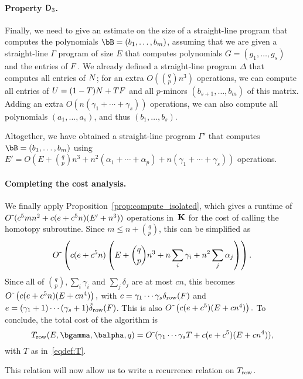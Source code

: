 \documentclass[12pt]{article}
\begin{document}
\paragraph{Property $\mathsf{D}_3$.} Finally, we need to give an estimate on
the size of a straight-line program that computes the polynomials
$\bB=(b_1,\dots,b_m)$, assuming that we are given a straight-line
$\Gamma$ program of size $E$ that computes polynomials
$G=(g_1,\dots,g_s)$ and the entries of ${F}$. We already defined a
straight-line program $\Delta$ that computes all entries of ${N}$; for
an extra $O({q \choose p} n^3)$ operations, we can compute all entries
of ${U}=(1-T){N}+T{F}$ and all $p$-minors $(b_{s+1},\dots,b_m)$ of
this matrix.  Adding an extra $O(n(\gamma_1 + \cdots + \gamma_s))$
operations, we can also compute all polynomials $(a_1,\dots,a_s)$, and
thus $(b_1,\dots,b_s)$.

Altogether, we have obtained a straight-line program $\Gamma'$ that
computes $\bB=(b_1,\dots,b_m)$ using $E'=O(E + {q \choose p} n^3 + n^2
(\alpha_1+\cdots+\alpha_p) + n(\gamma_1 + \cdots + \gamma_s))$ operations.

\paragraph{Completing the cost analysis.} We finally apply Proposition~\ref{prop:compute_isolated},
which gives a runtime of ${O}{\,\tilde{ }\,}(c^5 m n^2 + c(e+c^5 n)(E' + n^3))$
operations in~$\mathbf{K}$ for the cost of calling the homotopy
subroutine. Since $m \le n + {q \choose p}$, this can be simplified as
$${O}{\,\tilde{ }\,}\left (c(e+c^5 n)\left(E + {q \choose p} n^3 +n \sum_i
    \gamma_i + n^2 \sum_j \alpha_j\right)\right).$$
Since all of $ {q \choose p}, \sum_i \gamma_i$ and $\sum_j \delta_j$
are at most $cn$, this becomes
${O}{\,\tilde{ }\,}\left (c(e+c^5 n)(E + cn^4)\right),$ with
$c=\gamma_1\cdots\gamma_s \delta_{\rm row}({F})$  and
$e=(\gamma_1+1)\cdots(\gamma_s+1) \tilde\delta_{\rm row}({F})$.  This is also
${O}{\,\tilde{ }\,}\left (c(e+c^5 )(E + cn^4)\right).$ To conclude, the 
total cost of the algorithm is
$$T_{\rm row}(E,\bgamma,\balpha,q)= \softO(\gamma_1 \cdots\gamma_s T + c(e+c^5 )(E + cn^4)),$$
with $T$ as in~\eqref{eqdef:T}.

This relation will now allow us to write a recurrence relation 
on $T_{\rm row}$.



\end{document}
